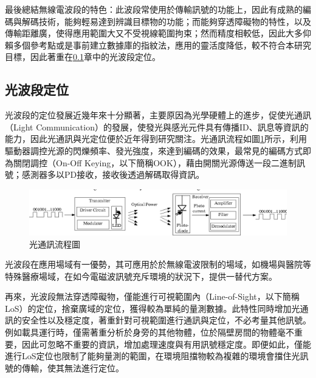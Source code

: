        最後總結無線電波段的特色：此波段常使用於傳輸訊號的功能上，因此有成熟的編碼與解碼技術，能夠輕易達到辨識目標物的功能；而能夠穿透障礙物的特性，以及傳輸距離廣，使得應用範圍大又不受視線範圍拘束；然而精度相較低，因此大多仰賴多個參考點或是事前建立數據庫的指紋法，應用的靈活度降低，較不符合本研究目標，因此著重在\ref{chp:light}章中的光波段定位。

       



       


        \subsection{光波段定位}
        \label{chp:light}
            
            光波段的定位發展近幾年來十分顯著，主要原因為光學硬體上的進步，促使光通訊（Light Communication）的發展，使發光與感光元件具有傳播ID、訊息等資訊的能力，因此光通訊與光定位便於近年得到研究關注。光通訊流程如圖\ref{pic:vlc_flow}所示，利用驅動器調控光源的閃爍頻率、發光強度，來達到編碼的效果，最常見的編碼方式即為關閉調控（On-Off Keying，以下簡稱OOK），藉由開關光源傳送一段二進制訊號；感測器多以PD接收，接收後透過解碼取得資訊。

            \begin{figure}[ht]
                \centering
                \includegraphics[width=15cm]{ch2pic/vlc_flow.png}
                \caption{光通訊流程圖\cite{pic:vlc}}
                \label{pic:vlc_flow}
            \end{figure}

            光波段在應用場域有一優勢，其可應用於於無線電波限制的場域，如機場與醫院等特殊醫療場域，在如今電磁波訊號充斥環境的狀況下，提供一替代方案。
            
            再來，光波段無法穿透障礙物，僅能進行可視範圍內（Line-of-Sight，以下簡稱LoS）的定位，捨棄廣域的定位，獲得較為單純的量測數據。此特性同時增加光通訊的安全性以及穩定度，著重針對可視範圍進行通訊與定位，不必考量其他訊號。例如載具運行時，僅需著重分析於身旁的其他物體，位於隔壁房間的物體毫不重要，因此可忽略不重要的資訊，增加處理速度與有用訊號穩定度。即便如此，僅能進行LoS定位也限制了能夠量測的範圍，在環境阻擋物較為複雜的環境會擋住光訊號的傳輸，使其無法進行定位。


